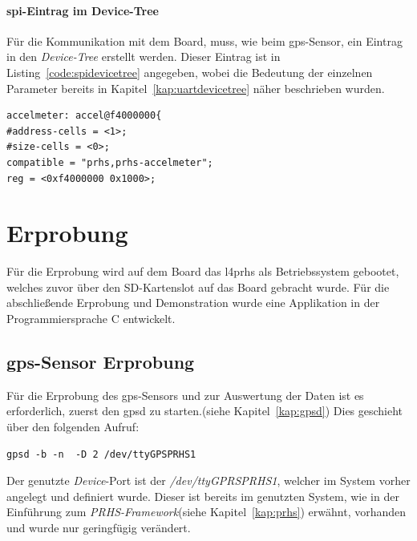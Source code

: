 \subsubsection{\ac{spi}-Eintrag im Device-Tree}\label{kap:spidevicetree}

Für die Kommunikation mit dem Board, muss, wie beim \ac{gps}-Sensor, ein Eintrag in den \emph{Device-Tree} erstellt werden.
 Dieser Eintrag ist in Listing~\ref{code:spidevicetree} angegeben, wobei die Bedeutung der einzelnen Parameter
 bereits in Kapitel~\ref{kap:uartdevicetree} näher beschrieben wurden.\\

\begin{lstlisting}[caption={Device-Tree Eintrag des \ac{spi}-Bausteins},label={code:spidevicetree}]
accelmeter: accel@f4000000{
#address-cells = <1>;
#size-cells = <0>;
compatible = "prhs,prhs-accelmeter";
reg = <0xf4000000 0x1000>;
 \end{lstlisting}



\chapter{Erprobung}\label{kap:erprobung}
Für die Erprobung wird auf dem Board das \ac{l4prhs} als Betriebssystem gebootet, welches zuvor über den SD-Kartenslot
auf das Board gebracht wurde. Für die abschließende Erprobung
und Demonstration wurde eine Applikation in der Programmiersprache C entwickelt.\\

\section{\ac{gps}-Sensor Erprobung}\label{kap:gpserprobung}

Für die Erprobung des \ac{gps}-Sensors und zur Auswertung der Daten ist es erforderlich, zuerst den
 \ac{gpsd} zu starten.(siehe Kapitel~\ref{kap:gpsd}) Dies geschieht über den folgenden Aufruf:\\

\begin{lstlisting}[caption={Tatsächlicher Aufruf des \ac{gpsd} in der Kommandozeile},label={code:gpsduse}]
  gpsd -b -n  -D 2 /dev/ttyGPSPRHS1
\end{lstlisting}

Der genutzte \emph{Device}-Port ist der \emph{/dev/ttyGPRSPRHS1}, welcher im System vorher angelegt und
definiert wurde. Dieser ist bereits im genutzten System, wie in der Einführung zum
\emph{PRHS-Framework}(siehe Kapitel~\ref{kap:prhs}) erwähnt, vorhanden und wurde nur geringfügig verändert.\cite{MEckertDiss}\\

